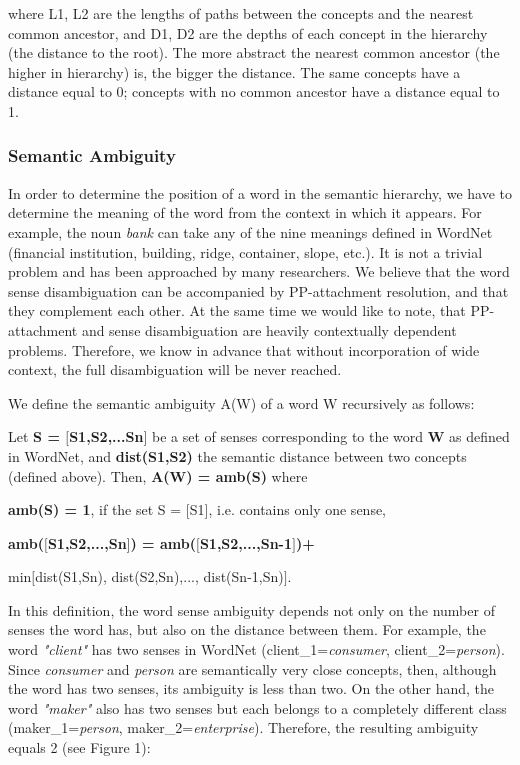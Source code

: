 \noindent
where L1, L2 are the lengths of paths between the concepts and the nearest common ancestor, and D1, D2 are the depths of each concept in the hierarchy (the distance to the root). The more abstract the nearest common ancestor (the higher in hierarchy) is, the bigger the distance. The same concepts have a distance equal to 0; concepts with no common ancestor have a distance equal to 1.

\subsubsection{Semantic Ambiguity}

In order to determine the position of a word in the semantic hierarchy, we have to determine the meaning of the word from the context in which it appears. For example, the noun {\it bank} can take any of the nine meanings defined in WordNet (financial institution, building, ridge, container, slope, etc.). It is not a trivial problem and has been approached by many researchers. We believe that the word sense disambiguation can be accompanied by \mbox{PP-attachment} resolution, and that they complement each other. At the same time we would like to note, that PP-attachment and sense disambiguation are heavily contextually dependent problems. Therefore, we know in advance that without incorporation of wide context, the full disambiguation will be never reached.

We define the semantic ambiguity A(W) of a word W recursively as follows: 

Let {\bf S = $[$S1,S2,...Sn$]$} be a set of senses corresponding to the word {\bf W} as defined in WordNet, and {\bf dist(S1,S2)} the semantic distance between two concepts (defined above). Then, {\bf A(W) = amb(S)} where

\begin{center}
{\bf amb(S) = 1}, if the set S = $[$S1$]$, i.e. contains only one sense,

{\bf amb($[$S1,S2,...,Sn$]$) = amb($[$S1,S2,...,Sn-1$]$)+

min$[$dist(S1,Sn), dist(S2,Sn),..., dist(Sn-1,Sn)$]$.}
\end{center}

In this definition, the word sense ambiguity depends not only on the number of senses the word has, but also on the distance between them. For example, the word {\it "client"} has two senses in WordNet ({\sf client\_{1}}={\it consumer}, {\sf client\_{2}}={\it person}). Since {\it consumer} and {\it person} are semantically very close concepts, then, although the word has two senses, its ambiguity is less than two. On the other hand, the word {\it "maker"} also has two senses but each belongs to a completely different class ({\sf maker\_{1}}={\it person}, {\sf maker\_{2}}={\it enterprise}). Therefore, the resulting ambiguity equals 2 (see Figure 1):

